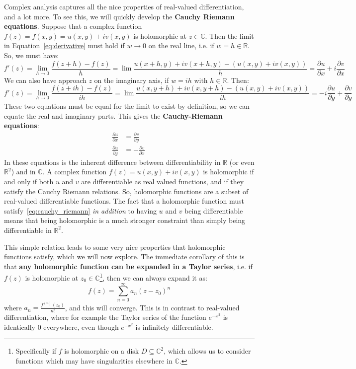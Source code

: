 \documentclass[11pt, oneside]{article}   	%
\theoremstyle{definition}
\begin{document}
Complex analysis captures all the nice 
properties of real-valued differentiation, and a lot more. To see this, we will quickly develop the \textbf{Cauchy Riemann 
equations}. Suppose that a complex function $f(z) = f(x, y) = u(x, y) + iv(x, y)$ is holomorphic at $z\in\mathbb C$. Then the limit 
in Equation~\ref{eq:derivative} must hold if $w\rightarrow 0$ on the real line, i.e. if $w = h\in\mathbb R$. So, we must have:
\begin{equation}
	f'(z) = \lim_{h\rightarrow 0} \frac{f(z + h) - f(z)}{h} = \lim \frac{u(x + h, y) + iv(x + h, y) - (u(x, y) + iv(x, y))}{h} 
	= \frac{\partial u}{\partial x} + i\frac{\partial v}{\partial x}\nonumber
\end{equation}
We can also have approach $z$ on the imaginary axis, if $w = ih$ with $h\in\mathbb R$. Then:
\begin{equation}
	f'(z) = \lim_{h\rightarrow 0} \frac{f(z + ih) - f(z)}{ih} = \lim\frac{u(x, y + h) + iv(x, y + h) - (u(x, y) + i v(x, y))}{ih} = 
	-i\frac{\partial u}{\partial y} + \frac{\partial v}{\partial y}
	\nonumber
\end{equation}
These two equations must be equal for the limit to exist by definition, so we can equate the real and imaginary parts. This 
gives the \textbf{Cauchy-Riemann equations}:
\begin{align}
	\frac{\partial u}{\partial x} &= \frac{\partial v}{\partial y} \nonumber\\
	\frac{\partial u}{\partial y} &= -\frac{\partial v}{\partial x}~
	\label{eq:cauchy_riemann}
\end{align}
In these equations is the inherent difference between differentiability in $\mathbb R$ (or even $\mathbb R^2$) and in 
$\mathbb C$. A complex function $f(z) = u(x, y) + iv(x, y)$ is holomorphic if and only if both $u$ and $v$ are 
differentiable as real valued functions, and if they satisfy the Cauchy Riemann relations. So, holomorphic functions are a 
subset of real-valued differentiable functions. The fact that a holomorphic function must satisfy~\ref{eq:cauchy_riemann} 
\textit{in addition} to having $u$ and $v$ being differentiable means that being holomorphic is a much stronger constraint than 
simply being differentiable in $\mathbb R^2$. 

This simple relation leads to some very nice properties that holomorphic functions satisfy, which we will now 
explore. The immediate corollary of this is that \textbf{any holomorphic function can be expanded in a Taylor series}, i.e. 
if $f(z)$ is holomorphic at $z_0\in\mathbb C$\footnote{Specifically if $f$ is holomorphic on a disk $D\subseteq\mathbb C^2$, 
which allows us to consider functions which may have singularities elsewhere in $\mathbb C$.}, then we can always expand it 
as:
\begin{equation}
	f(z) = \sum_{n = 0}^\infty a_n (z - z_0)^n
\end{equation}
where $a_n = \frac{f^{(n)}(z_0)}{n!}$, and this will converge. This is in contrast to real-valued differentiation, where for example 
the Taylor series of the function $e^{-x^2}$ is identically 0 everywhere, even though $e^{-x^2}$ is infinitely differentiable. 
\end{document}

